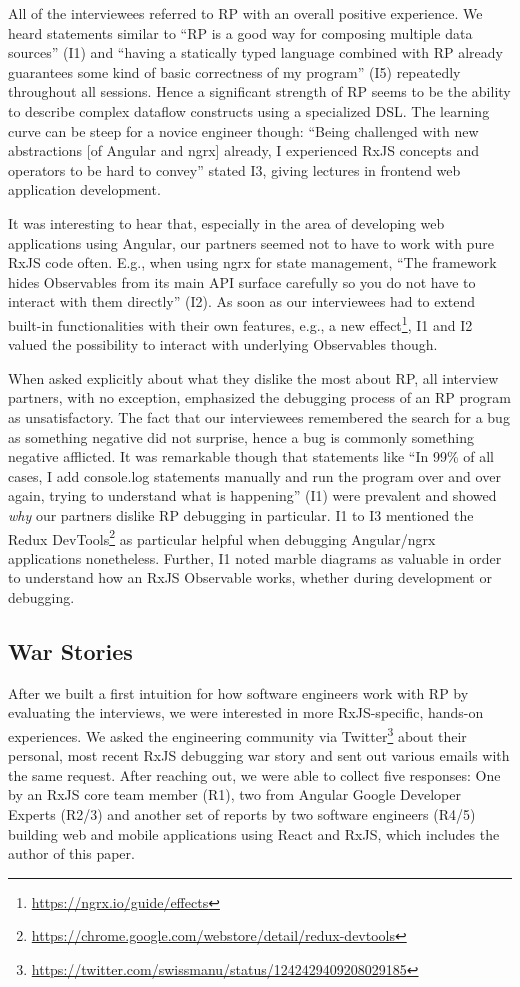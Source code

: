 \documentclass[12pt,a4paper]{article}
\begin{document}
All of the interviewees referred to RP with an overall positive experience. We heard statements similar to ``RP is a good way for composing multiple data sources'' (I1) and ``having a statically typed language combined with RP already guarantees some kind of basic correctness of my program'' (I5) repeatedly throughout all sessions. Hence a significant strength of RP seems to be the ability to describe complex dataflow constructs using a specialized DSL. The learning curve can be steep for a novice engineer though: ``Being challenged with new abstractions [of Angular and ngrx] already, I experienced RxJS concepts and operators to be hard to convey'' stated I3, giving lectures in frontend web application development.

It was interesting to hear that, especially in the area of developing web applications using Angular, our partners seemed not to have to work with pure RxJS code often. E.g., when using ngrx for state management, ``The framework hides Observables from its main API surface carefully so you do not have to interact with them directly'' (I2). As soon as our interviewees had to extend built-in functionalities with their own features, e.g., a new effect\footnote{\url{https://ngrx.io/guide/effects}}, I1 and I2 valued the possibility to interact with underlying Observables though.

When asked explicitly about what they dislike the most about RP, all interview partners, with no exception, emphasized the debugging process of an RP program as unsatisfactory. The fact that our interviewees remembered the search for a bug as something negative did not surprise, hence a bug is commonly something negative afflicted. It was remarkable though that statements like ``In 99\% of all cases, I add console.log statements manually and run the program over and over again, trying to understand what is happening'' (I1) were prevalent and showed \emph{why} our partners dislike RP debugging in particular. I1 to I3 mentioned the Redux DevTools\footnote{\url{https://chrome.google.com/webstore/detail/redux-devtools}} as particular helpful when debugging Angular/ngrx applications nonetheless. Further, I1 noted marble diagrams as valuable in order to understand how an RxJS Observable works, whether during development or debugging.

\subsection{War Stories}

After we built a first intuition for how software engineers work with RP by evaluating the interviews, we were interested in more RxJS-specific, hands-on experiences. We asked the engineering community via Twitter\footnote{\url{https://twitter.com/swissmanu/status/1242429409208029185}} about their personal, most recent RxJS debugging war story and sent out various emails with the same request. After reaching out, we were able to collect five responses: One by an RxJS core team member (R1), two from Angular Google Developer Experts (R2/3) and another set of reports by two software engineers (R4/5) building web and mobile applications using React and RxJS, which includes the author of this paper.
\end{document}
